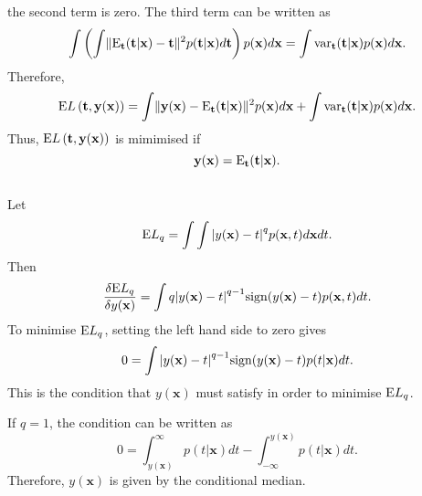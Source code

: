 %
the second term is zero.
The third term can be written as
%
\begin{equation}
\int \left( \int \lVert {\rm E}_\mathbf{t} (\mathbf{t} | \mathbf{x}) - \mathbf{t} \rVert ^ 2 p(\mathbf{t} | \mathbf{x}) d\mathbf{t} \right) p(\mathbf{x}) d\mathbf{x} = \int {\rm var}_{\mathbf{t}} (\mathbf{t} | \mathbf{x}) p(\mathbf{x}) d\mathbf{x}.
\end{equation}
%
Therefore,
%
\begin{equation}
{\rm E} L\left( \mathbf{t}, \mathbf{y} (\mathbf{x}) \right) = \int \lVert \mathbf{y}(\mathbf{x}) - {\rm E}_\mathbf{t} (\mathbf{t} | \mathbf{x}) \rVert ^ 2 p(\mathbf{x}) d\mathbf{x} + \int {\rm var}_{\mathbf{t}} (\mathbf{t} | \mathbf{x}) p(\mathbf{x}) d\mathbf{x}.
\end{equation}
%
Thus, ${\rm E} L\left( \mathbf{t}, \mathbf{y} (\mathbf{x}) \right)$ is mimimised if
%
\begin{equation}
\mathbf{y} (\mathbf{x}) = {\rm E}_\mathbf{t} (\mathbf{t} | \mathbf{x}).
\end{equation}


\subsection{}
Let
%
\begin{equation}
{\rm E} L_q = \int \int \abs{y(\mathbf{x}) - t} ^ q p(\mathbf{x}, t) d\mathbf{x} dt.
\end{equation}
%
Then
%
\begin{equation}
\frac{\delta {\rm E} L_q}{\delta y (\mathbf{x})} = \int q \abs{y(\mathbf{x}) - t} ^ {q - 1} {\rm sign} (y(\mathbf{x}) - t) p(\mathbf{x}, t) dt.
\end{equation}
%
To minimise ${\rm E} L_q$, setting the left hand side to zero gives
%
\begin{equation}
0 = \int \abs{y(\mathbf{x}) - t} ^ {q - 1} {\rm sign} (y(\mathbf{x}) - t) p(t | \mathbf{x}) dt.
\end{equation}
%
This is the condition that $y(\mathbf{x})$ must satisfy in order to minimise ${\rm E} L_q$.

If $q = 1$, the condition can be written as
%
\begin{equation}
0 = \int_{y(\mathbf{x})}^{\infty} p(t | \mathbf{x}) dt - \int_{- \infty}^{y(\mathbf{x})} p(t | \mathbf{x}) dt.
\end{equation}
%
Therefore, $y(\mathbf{x})$ is given by the conditional median.


